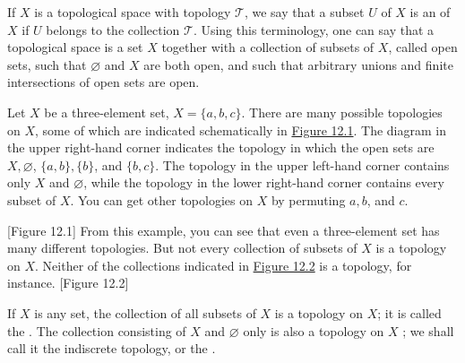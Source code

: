 If \(X\) is a topological space with topology \(\mathcal{T}\), we say that a subset \(U\) of \(X\) is an  of \(X\) if \(U\) belongs to the collection \(\mathcal{T}\). Using this terminology, one can say that a topological space is a set \(X\) together with a collection of subsets of \(X\), called open sets, such that \(\varnothing\) and \(X\) are both open, and such that arbitrary unions and finite intersections of open sets are open.

\begin{centeredblock*}
 \begin{example}
\label{ex:\thesection.\theexample}
  Let \(X\) be a three-element set, \(X = \{ a,b,c\}\). There are many possible topologies on \(X\), some of which are indicated schematically in \hyperref[fig:12.1]{Figure 12.1}. The diagram in the upper right-hand corner indicates the topology in which the open sets are \(X,\varnothing\), \(\{ a,b\},\{ b\}\), and \(\{ b,c\}\). The topology in the upper left-hand corner contains only \(X\) and \(\varnothing\), while the topology in the lower right-hand corner contains every subset of \(X\). You can get other topologies on \(X\) by permuting \(a,b\), and \(c\).
 \end{example}
 [Figure 12.1]
 From this example, you can see that even a three-element set has many different topologies. But not every collection of subsets of \(X\) is a topology on \(X\). Neither of the collections indicated in \hyperref[fig:12.2]{Figure 12.2} is a topology, for instance.
 [Figure 12.2]
\end{centeredblock*}

\begin{centeredblock}
 \begin{example}
\label{ex:\thesection.\theexample}
  If \(X\) is any set, the collection of all subsets of \(X\) is a topology on \(X\); it is called the . The collection consisting of \(X\) and \(\varnothing\) only is also a topology on \(X\) ; we shall call it the indiscrete topology, or the .
 \end{example}
\end{centeredblock}

